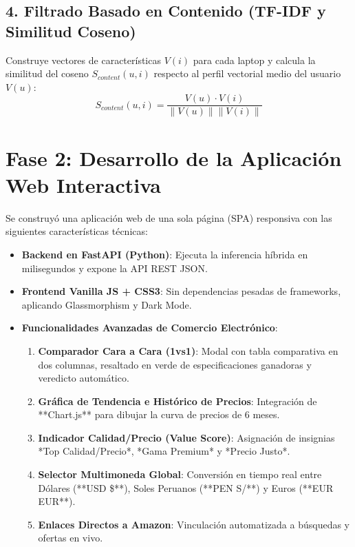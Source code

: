 \subsection{4. Filtrado Basado en Contenido (TF-IDF y Similitud Coseno)}
Construye vectores de características $V(i)$ para cada laptop y calcula la similitud del coseno $S_{content}(u, i)$ respecto al perfil vectorial medio del usuario $V(u)$:
\begin{equation}
S_{content}(u, i) = \frac{V(u) \cdot V(i)}{\|V(u)\| \|V(i)\|}
\end{equation}

\section{Fase 2: Desarrollo de la Aplicación Web Interactiva}
Se construyó una aplicación web de una sola página (SPA) responsiva con las siguientes características técnicas:
\begin{itemize}
    \item \textbf{Backend en FastAPI (Python)}: Ejecuta la inferencia híbrida en milisegundos y expone la API REST JSON.
    \item \textbf{Frontend Vanilla JS + CSS3}: Sin dependencias pesadas de frameworks, aplicando Glassmorphism y Dark Mode.
    \item \textbf{Funcionalidades Avanzadas de Comercio Electrónico}:
    \begin{enumerate}
        \item \textbf{Comparador Cara a Cara (1vs1)}: Modal con tabla comparativa en dos columnas, resaltado en verde de especificaciones ganadoras y veredicto automático.
        \item \textbf{Gráfica de Tendencia e Histórico de Precios}: Integración de **Chart.js** para dibujar la curva de precios de 6 meses.
        \item \textbf{Indicador Calidad/Precio (Value Score)}: Asignación de insignias *Top Calidad/Precio*, *Gama Premium* y *Precio Justo*.
        \item \textbf{Selector Multimoneda Global}: Conversión en tiempo real entre Dólares (**USD \$**), Soles Peruanos (**PEN S/**) y Euros (**EUR EUR**).
        \item \textbf{Enlaces Directos a Amazon}: Vinculación automatizada a búsquedas y ofertas en vivo.
    \end{enumerate}
\end{itemize}

